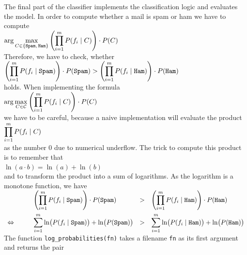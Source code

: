 The final part of the classifier implements the classification logic and evaluates the model.
In order to compute whether a mail is spam or ham we have to compute
\\[0.2cm]
\hspace*{1.3cm}
$\displaystyle \arg\max\limits_{C \in \{\mathtt{Spam},\, \mathtt{Ham}\}}  \left(\prod\limits_{i=1}^m P(f_i \;|\; C)\right) \cdot P(C) $
\\[0.2cm]
Therefore, we have to check, whether
\\[0.2cm]
\hspace*{1.3cm}
$\displaystyle \left(\prod\limits_{i=1}^m P(f_i \;|\; \mathtt{Spam})\right) \cdot P(\mathtt{Spam}) > \left(\prod\limits_{i=1}^m P(f_i \;|\; \mathtt{Ham})\right) \cdot P(\mathtt{Ham}) $
\\[0.2cm]
holds. When implementing the formula
\\[0.2cm]
\hspace*{1.3cm}
$\displaystyle \arg\max\limits_{C \in \mathcal{C}}  \left(\prod\limits_{i=1}^m P(f_i \;|\; C)\right) \cdot P(C) $
\\[0.2cm]
we have to be careful, because a naive implementation will evaluate the product
\\[0.2cm]
\hspace*{1.3cm}
$\displaystyle \prod\limits_{i=1}^m P(f_i \;|\; C)$
\\[0.2cm]
as the number $0$ due to numerical underflow.  The trick to compute this product is to remember that
\\[0.2cm]
\hspace*{1.3cm}
$ \ln(a \cdot b) = \ln(a) + \ln(b) $
\\[0.2cm]
and to transform the product into a sum of logarithms.  As the logarithm is a monotone function, we have
\\[0.2cm]
\hspace*{1.3cm}
$ \begin{array}{llcl}
  & \displaystyle \left(\prod\limits_{i=1}^m P(f_i \;|\; \mathtt{Spam})\right) \cdot P(\mathtt{Spam}) & > & \displaystyle \left(\prod\limits_{i=1}^m P(f_i \;|\; \mathtt{Ham})\right) \cdot P(\mathtt{Ham}) \\[0.5cm]
  \Leftrightarrow \qquad &
  \displaystyle \sum\limits_{i=1}^m \ln\bigl(P(f_i \;|\; \mathtt{Spam})\bigr) + \ln\bigl(P(\mathtt{Spam})\bigr) & > & \displaystyle \sum\limits_{i=1}^m \ln\bigl(P(f_i \;|\; \mathtt{Ham})\bigr) + \ln\bigl(P(\mathtt{Ham}) \bigr)
  \end{array}
$
\\[0.2cm]
The function \texttt{log\_probabilities(fn)} takes a filename \texttt{fn} as its first argument and returns the pair
